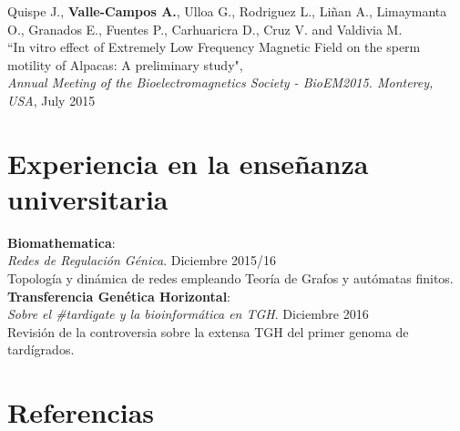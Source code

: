 \documentclass[margin,line]{res}
\begin{document}
\begin{resume}
		Quispe J., \textbf{Valle-Campos A.}, Ulloa G., Rodriguez L., Liñan A., Limaymanta O., Granados E., Fuentes P., Carhuaricra D., Cruz V. and Valdivia M.\\ ``In vitro effect of Extremely Low Frequency Magnetic Field on the sperm motility of Alpacas: A preliminary study", \\ {\em Annual Meeting of the Bioelectromagnetics Society - BioEM2015. Monterey, USA}, July 2015\\
		
		
		
		
		\section{\sc Experiencia en la enseñanza universitaria}
		{\bf Biomathematica}: \\ {\em Redes de Regulación Génica}. \hfill {Diciembre 2015/16}\\ Topología y dinámica de redes empleando Teoría de Grafos y autómatas finitos. \\ %
		{\bf Transferencia Genética Horizontal}: \\ {\em Sobre el \#tardigate y la bioinformática en TGH}. \hfill {Diciembre 2016}\\ Revisión de la controversia sobre la extensa TGH del primer genoma de tardígrados.\\
		
		
		\section{\sc Referencias}
		

\end{resume}
\end{document}
